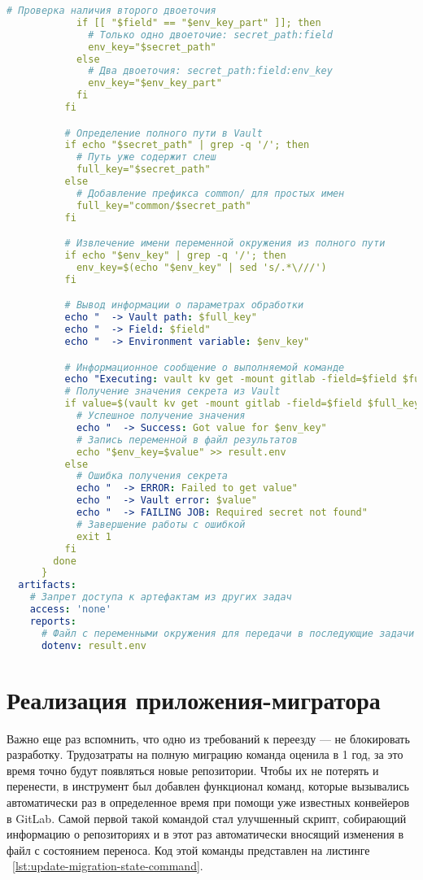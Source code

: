 \begin{lstlisting}[language=yaml,label={lst:component-template},caption={Компонентный шаблон для load-vault-secret}]
            # Проверка наличия второго двоеточия
            if [[ "$field" == "$env_key_part" ]]; then
              # Только одно двоеточие: secret_path:field
              env_key="$secret_path"
            else
              # Два двоеточия: secret_path:field:env_key
              env_key="$env_key_part"
            fi
          fi

          # Определение полного пути в Vault
          if echo "$secret_path" | grep -q '/'; then
            # Путь уже содержит слеш
            full_key="$secret_path"
          else
            # Добавление префикса common/ для простых имен
            full_key="common/$secret_path"
          fi

          # Извлечение имени переменной окружения из полного пути
          if echo "$env_key" | grep -q '/'; then
            env_key=$(echo "$env_key" | sed 's/.*\///')
          fi

          # Вывод информации о параметрах обработки
          echo "  -> Vault path: $full_key"
          echo "  -> Field: $field"
          echo "  -> Environment variable: $env_key"

          # Информационное сообщение о выполняемой команде
          echo "Executing: vault kv get -mount gitlab -field=$field $full_key"
          # Получение значения секрета из Vault
          if value=$(vault kv get -mount gitlab -field=$field $full_key 2>&1); then
            # Успешное получение значения
            echo "  -> Success: Got value for $env_key"
            # Запись переменной в файл результатов
            echo "$env_key=$value" >> result.env
          else
            # Ошибка получения секрета
            echo "  -> ERROR: Failed to get value"
            echo "  -> Vault error: $value"
            echo "  -> FAILING JOB: Required secret not found"
            # Завершение работы с ошибкой
            exit 1
          fi
        done
      }
  artifacts:
    # Запрет доступа к артефактам из других задач
    access: 'none'
    reports:
      # Файл с переменными окружения для передачи в последующие задачи
      dotenv: result.env
\end{lstlisting}

\section{Реализация приложения-мигратора} \label{sec:migrator-impl}
Важно еще раз вспомнить, что одно из требований к переезду — не блокировать разработку.
Трудозатраты на полную миграцию команда оценила в 1 год, за это время точно будут появляться новые репозитории.
Чтобы их не потерять и перенести, в инструмент был добавлен функционал команд,
которые вызывались автоматически раз в определенное время при помощи уже известных конвейеров в GitLab.
Самой первой такой командой стал улучшенный скрипт, собирающий информацию о репозиториях и в этот раз автоматически вносящий изменения в файл с состоянием переноса.
Код этой команды представлен на листинге ~\ref{lst:update-migration-state-command}.

